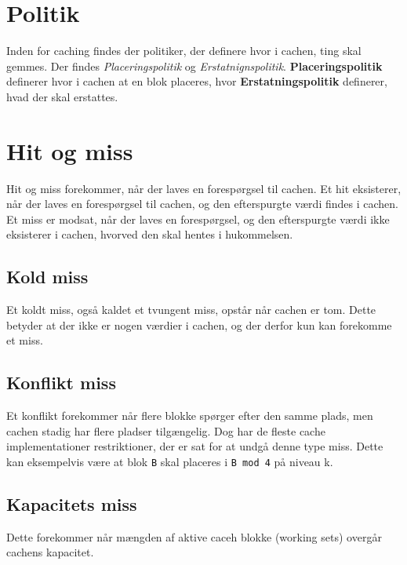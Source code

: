 \section{Politik}
Inden for caching findes der politiker, der definere hvor i cachen, ting skal gemmes.
Der findes \textit{Placeringspolitik} og \textit{Erstatnignspolitik}.
\textbf{Placeringspolitik} definerer hvor i cachen at en blok placeres, hvor \textbf{Erstatningspolitik} definerer, hvad der skal erstattes.
\section{Hit og miss}
Hit og miss forekommer, når der laves en forespørgsel til cachen.
Et hit eksisterer, når der laves en forespørgsel til cachen, og den efterspurgte værdi findes i cachen.
Et miss er modsat, når der laves en forespørgsel, og den efterspurgte værdi ikke eksisterer i cachen, hvorved den skal hentes i hukommelsen.
\subsection{Kold miss}
Et koldt miss, også kaldet et tvungent miss, opstår når cachen er tom. Dette betyder at der ikke er nogen værdier i cachen, og der derfor kun kan forekomme et miss.
\subsection{Konflikt miss}
Et konflikt forekommer når flere blokke spørger efter den samme plads, men cachen stadig har flere pladser tilgængelig.
Dog har de fleste cache implementationer restriktioner, der er sat for at undgå denne type miss.
Dette kan eksempelvis være at blok \verb|B| skal placeres i \verb|B mod 4| på niveau k.
\subsection{Kapacitets miss}
Dette forekommer når mængden af aktive caceh blokke (working sets) overgår cachens kapacitet.




